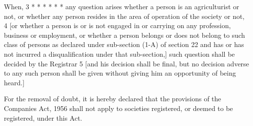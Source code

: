 \documentclass[reprint]{mhact}
\begin{document}




    When, 3 * * * * * * any question arises whether a person is an
    agriculturist or not, or whether any person resides in the area of
    operation of the society or not, 4 [or whether a person is or is
    not engaged in or carrying on any profession, business or
    employment, or whether a person belongs or does not belong to such
    class of persons as declared under sub-section (1-A) of section 22
    and has or has not incurred a disqualification under that
    sub-section,] such question shall be decided by the Registrar 5
    [and his decision shall be final, but no decision adverse to any
    such person shall be given without giving him an opportunity of
    being heard.]





     For the removal of
    doubt, it is hereby declared that the provisions of the Companies
    Act, 1956 shall not apply to
    societies registered, or deemed to be registered, under this Act.

    
\end{document}
